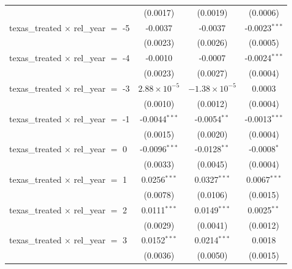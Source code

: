 \begin{tabular}{lccc}
                                                & (0.0017)              & (0.0019)               & (0.0006)\\   
   texas\_treated $\times$ rel\_year $=$ -5     & -0.0037               & -0.0037                & -0.0023$^{***}$\\   
                                                & (0.0023)              & (0.0026)               & (0.0005)\\   
   texas\_treated $\times$ rel\_year $=$ -4     & -0.0010               & -0.0007                & -0.0024$^{***}$\\   
                                                & (0.0023)              & (0.0027)               & (0.0004)\\   
   texas\_treated $\times$ rel\_year $=$ -3     & $2.88\times 10^{-5}$  & $-1.38\times 10^{-5}$  & 0.0003\\   
                                                & (0.0010)              & (0.0012)               & (0.0004)\\   
   texas\_treated $\times$ rel\_year $=$ -1     & -0.0044$^{***}$       & -0.0054$^{**}$         & -0.0013$^{***}$\\   
                                                & (0.0015)              & (0.0020)               & (0.0004)\\   
   texas\_treated $\times$ rel\_year $=$ 0      & -0.0096$^{***}$       & -0.0128$^{**}$         & -0.0008$^{*}$\\   
                                                & (0.0033)              & (0.0045)               & (0.0004)\\   
   texas\_treated $\times$ rel\_year $=$ 1      & 0.0256$^{***}$        & 0.0327$^{***}$         & 0.0067$^{***}$\\   
                                                & (0.0078)              & (0.0106)               & (0.0015)\\   
   texas\_treated $\times$ rel\_year $=$ 2      & 0.0111$^{***}$        & 0.0149$^{***}$         & 0.0025$^{**}$\\   
                                                & (0.0029)              & (0.0041)               & (0.0012)\\   
   texas\_treated $\times$ rel\_year $=$ 3      & 0.0152$^{***}$        & 0.0214$^{***}$         & 0.0018\\   
                                                & (0.0036)              & (0.0050)               & (0.0015)\\   

\end{tabular}
